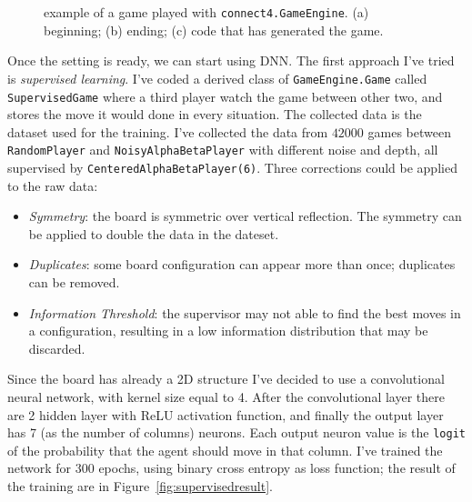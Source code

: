 \documentclass{article}
\newcommand{\ipy}[1]{\texttt{#1}}
\begin{document}
\begin{figure}
    \caption{example of a game played with \ipy{connect4.GameEngine}. (a) beginning; (b) ending; (c) code that has generated the game.}
    \label{fig:screenshot}
  \end{figure}

  Once the setting is ready, we can start using DNN. The first approach I've tried is \emph{supervised learning}. I've coded a
  derived class of \ipy{GameEngine.Game} called \ipy{SupervisedGame} where a third player watch the game between other two, and stores the move it would done in every situation. The collected data is the dataset used for the training. I've collected the data from \(42000\) games between \ipy{RandomPlayer} and \ipy{NoisyAlphaBetaPlayer} with different noise and depth, all supervised by \ipy{CenteredAlphaBetaPlayer(6)}. Three corrections could be applied to the raw data:
  \begin{itemize}
    \item \emph{Symmetry}: the board is symmetric over vertical reflection. The symmetry can be applied to double the data in the dateset.
    \item \emph{Duplicates}: some board configuration can appear more than once; duplicates can be removed.
    \item \emph{Information Threshold}: the supervisor may not able to find the best moves in a configuration, resulting in a low information distribution that may be discarded.
  \end{itemize}
  Since the board has already a 2D structure I've decided to use a convolutional neural network, with kernel size equal to 4. After the convolutional layer there are 2 hidden layer with ReLU activation function, and finally the output layer has 7 (as the number of columns) neurons. Each output neuron value is the \texttt{logit} of the probability that the agent should move in that column.
  I've trained the network for 300 epochs, using binary cross entropy as loss function; the result of the training are in Figure~\ref{fig:supervisedresult}.
  
%    
  
  
\end{document}

